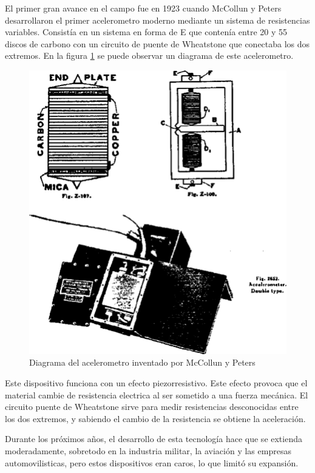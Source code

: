 \documentclass[12pt]{article}
\numberwithin{equation}{section}
\begin{document}
{El primer gran avance en el campo fue en 1923 cuando McCollun y Peters\cite{6534032} desarrollaron el primer acelerometro moderno mediante un sistema de resistencias variables. Consistía en un sistema en forma de E que contenía entre 20 y 55 discos de carbono con un circuito de puente de Wheatstone que conectaba los dos extremos. En la figura \ref{fig:wheatstone} se puede observar un diagrama de este acelerometro.

\begin{figure}[h]
    \centering
    \includegraphics[scale=0.2]{mcculling.png}
    \caption{Diagrama del acelerometro inventado por McCollun y Peters}
    \label{fig:wheatstone}
\end{figure}

Este dispositivo funciona con un efecto piezorresistivo. Este efecto provoca que el material cambie de resistencia electrica al ser sometido a una fuerza mecánica. El circuito puente de Wheatstone sirve para medir resistencias desconocidas entre los dos extremos, y sabiendo el cambio de la resistencia se obtiene la aceleración.

Durante los próximos años, el desarrollo de esta tecnología hace que se extienda moderadamente, sobretodo en la industria militar, la aviación y las empresas automovilisticas, pero estos dispositivos eran caros, lo que limitó su expansión.

}
\end{document}
